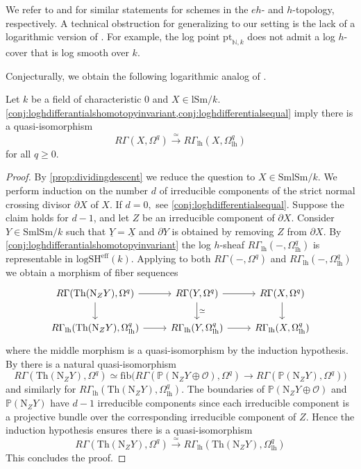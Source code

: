 \documentclass[10pt]{amsart}
\newcommand{\N}{\mathbb{N}}
\renewcommand{\P}{\mathbb{P}}
\newcommand{\cO}{\mathcal{O}}
\newcommand{\rN}{\mathrm{N}}
\newcommand{\ul}{\underline}
\newcommand{\fib}{\mathrm{fib}}
\newcommand{\lh}{\mathrm{lh}}
\newcommand{\SmlSm}{\mathrm{SmlSm}}
\newcommand{\lSm}{\mathrm{lSm}}
\newcommand{\eff}{\mathrm{eff}}
\newcommand{\pt}{\mathrm{pt}}
\newcommand{\logSH}{\mathrm{logSH}}
\begin{document}
\begin{remark}
We refer to \cite[Theorem 4.7]{Geisser} and \cite[Corollary 6.5]{HuberJorder} 
for similar statements for schemes in the $eh$- and $h$-topology, respectively.
A technical obstruction for generalizing \cite[Theorem 4.7]{Geisser} to our setting 
is the lack of a logarithmic version of \cite[Corollary 2.6]{Geisser}.
For example,
the log point
$\pt_{\N,k}$
does not admit a log $h$-cover that is log smooth over $k$.
\end{remark}


Conjecturally, we obtain the following logarithmic analog of \cite[Corollary 6.5]{HuberJorder}.
\begin{theorem}\label{thm:loghdifferentials}
Let $k$ be a field of characteristic 0 and $X \in \lSm/k$.
\cref{conj:loghdifferantialshomotopyinvariant,conj:loghdifferentialsequal} imply 
there is a quasi-isomorphism
$$R\Gamma(X,\Omega^q) \overset{\simeq}{\longrightarrow} R\Gamma_{\lh}(X,\Omega^q_{\lh})$$
for all $q\geq 0.$
\end{theorem}
\begin{proof}
By \cref{prop:dividingdescent} we reduce the question to $X \in \SmlSm/k$.
We perform induction on the number $d$ of irreducible components of the strict normal crossing divisor $\partial X$ of $X.$ 
If $d=0,$ see \cref{conj:loghdifferentialsequal}. 
Suppose the claim holds for $d-1$, and let $Z$ be an irreducible component of $\partial X$.
Consider $Y\in \SmlSm/k$ such that $\ul{Y}=\ul{X}$ and $\partial Y$ is obtained by removing 
$Z$ from $\partial X$.
By \cref{conj:loghdifferantialshomotopyinvariant} the log $h$-sheaf 
$R\Gamma_{\lh}(-,\Omega^q_{\lh})$ is representable in $\logSH^\eff(k)$.
Applying \cite[Theorem 7.5.4]{logDM} to both $R\Gamma(-,\Omega^q)$ and 
$R\Gamma_{\lh}(-,\Omega^q_{\lh})$ we obtain a morphism of fiber sequences
$$
\begin{tikzcd}
R\Gamma(\mathrm{Th}(\rN_Z Y), \Omega^q) \ar[r]\ar[d] &  R\Gamma(Y, \Omega^q) \ar[r] \ar[d, "\simeq"]  & R\Gamma(X, \Omega^q)\ar[d]
\\
R\Gamma_{\lh}(\mathrm{Th}(\rN_Z Y), \Omega^q_{\lh}) \ar[r]&  R\Gamma_{\lh}(Y, \Omega^q_{\lh}) \ar[r] & R\Gamma_{\lh}(X, \Omega^q_{\lh})
\end{tikzcd}
$$
where the middle morphism is a quasi-isomorphism by the induction hypothesis.
By \cite[Proposition 7.4.5]{logDM} there is a natural quasi-isomorphism
$$
R\Gamma(\mathrm{Th}(\rN_ZY),\Omega^q)
\simeq
\fib\big(R\Gamma(\P(\rN_ZY\oplus \cO),\Omega^q)\to R\Gamma(\P(\rN_ZY),\Omega^q) \big)
$$
and similarly for $R\Gamma_\lh(\mathrm{Th}(\rN_ZY), \Omega_\lh^q)$.
The boundaries of $\P(\rN_ZY\oplus \cO)$ and $\P(\rN_ZY)$ have $d-1$ irreducible components 
since each irreducible component is a projective bundle over the corresponding irreducible 
component of $Z$.
Hence the induction hypothesis ensures there is a quasi-isomorphism
$$R\Gamma(\mathrm{Th}(\rN_ZY), \Omega^q) 
\overset{\simeq}{\longrightarrow} R\Gamma_\lh(\mathrm{Th}(\rN_Z Y), \Omega_\lh^q)$$
This concludes the proof.
\end{proof} 
\end{document}
